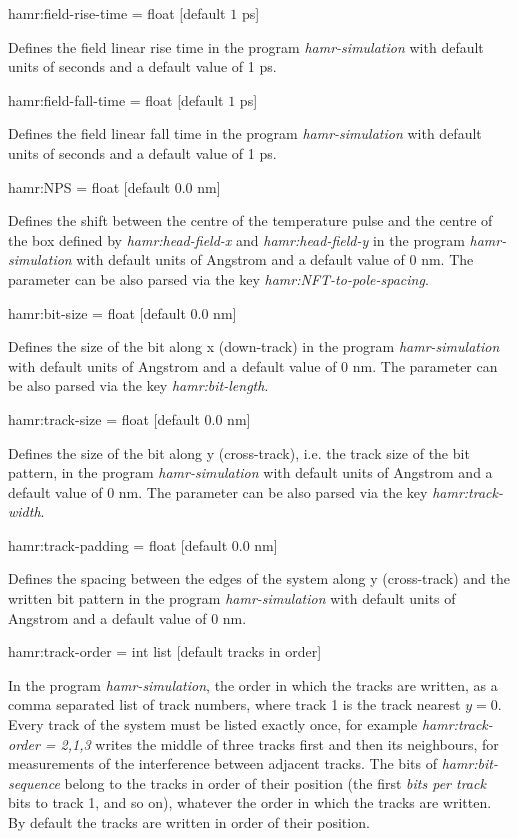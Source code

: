 {\zicf hamr:field-rise-time = float [default $1$ ps]}
Defines the field linear rise time in the program \textit{hamr-simulation} with default units of seconds and a default value of 1 ps.

{\zicf hamr:field-fall-time = float [default $1$ ps]}
Defines the field linear fall time in the program \textit{hamr-simulation} with default units of seconds and a default value of 1 ps.

{\zicf hamr:NPS = float [default $0.0$ nm]}
Defines the shift between the centre of the temperature pulse and the centre of the box defined by \textit{hamr:head-field-x} and \textit{hamr:head-field-y}
in the program \textit{hamr-simulation} with default units of Angstrom and a default value of 0 nm.
The parameter can be also parsed via the key \textit{hamr:NFT-to-pole-spacing}.

{\zicf hamr:bit-size = float [default $0.0$ nm]}
Defines the size of the bit along x (down-track)
in the program \textit{hamr-simulation} with default units of Angstrom and a default value of 0 nm.
The parameter can be also parsed via the key \textit{hamr:bit-length}.

{\zicf hamr:track-size = float [default $0.0$ nm]}
Defines the size of the bit along y (cross-track), i.e. the track size of the bit pattern,
in the program \textit{hamr-simulation} with default units of Angstrom and a default value of 0 nm.
The parameter can be also parsed via the key \textit{hamr:track-width}.

{\zicf hamr:track-padding = float [default $0.0$ nm]}
Defines the spacing between the edges of the system along y (cross-track) and the written bit pattern
in the program \textit{hamr-simulation} with default units of Angstrom and a default value of 0 nm.

{\zicf hamr:track-order = int list [default tracks in order]}
In the program \textit{hamr-simulation}, the order in which the tracks are written, as a comma separated list of track numbers, where track 1 is the track nearest $y = 0$. Every track of the system must be listed exactly once, for example \textit{hamr:track-order = 2,1,3} writes the middle of three tracks first and then its neighbours, for measurements of the interference between adjacent tracks. The bits of \textit{hamr:bit-sequence} belong to the tracks in order of their position (the first \textit{bits per track} bits to track 1, and so on), whatever the order in which the tracks are written. By default the tracks are written in order of their position.

